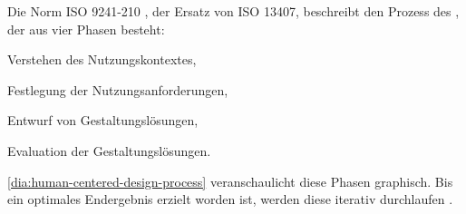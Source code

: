 Die Norm ISO 9241-210 \cite{ISO-Central-Secretary:2019:Ergonomics-of-human-system-interaction}, der Ersatz von ISO 13407, beschreibt den Prozess des , der aus vier Phasen besteht:
\begin{enumerate*}[label=(\arabic*)]
	\item Verstehen des Nutzungskontextes,
	\item Festlegung der Nutzungsanforderungen,
	\item Entwurf von Gestaltungslösungen,
	\item Evaluation der Gestaltungslösungen.
\end{enumerate*}
\autoref{dia:human-centered-design-process} veranschaulicht diese Phasen graphisch. Bis ein optimales Endergebnis erzielt worden ist, werden diese iterativ durchlaufen \cite{Burmester::Design-Thinking--die-neue}\cite{Geis::Neue-ISO-9241-210-Prozess}.

